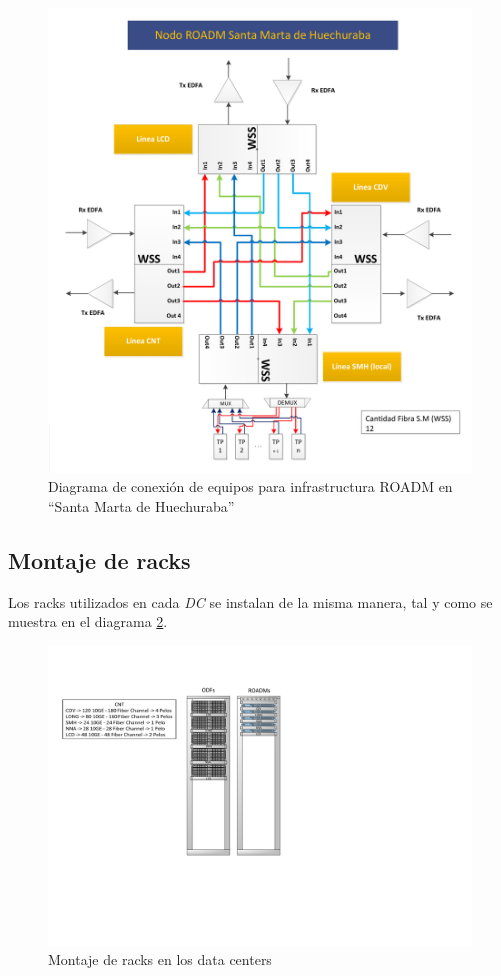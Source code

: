 \begin{figure}[H]
  \centering
  \includegraphics[width=17cm]{Imagenes/SMH.pdf}
  \caption{Diagrama de conexión de equipos para infrastructura ROADM en ``Santa Marta de Huechuraba''}
  \label{fig:drsmh}
\end{figure}

\subsection{Montaje de racks}
\label{sec:racks}

Los racks utilizados en cada \emph{DC} se instalan de la misma manera,
tal y como se muestra en el diagrama \ref{fig:racks}.

\begin{figure}[H]
  \centering
  \includegraphics[width=12cm]{Imagenes/racks3.pdf}
  \caption{Montaje de racks en los data centers}
  \label{fig:racks}
\end{figure}

